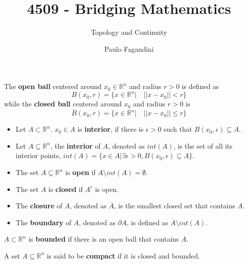 \documentclass[aspectratio=169]{beamer}
\title[]{4509 - Bridging Mathematics}
\subtitle{Topology and Continuity}
\author[P. Fagandini]{Paulo Fagandini}
\institute{}
\date{}
\begin{document}
\begin{frame}
   \begin{definition}
    The \textbf{open ball} centered around $x_0\in\mathds{R}^n$ and radius $r>0$ is defined as $$B(x_0,r)=\{x\in\mathds{R}^n | \quad ||x-x_0||<r\}$$ while the \textbf{closed ball} centered around $x_0$ and radius $r>0$ is $$\overline{B}(x_0,r)=\{x\in\mathds{R}^n| \quad ||x-x_0||\leq r\}$$
   \end{definition}
\end{frame}

\begin{frame}
    \begin{definition}
    \begin{itemize}
        \item Let $A\subset\mathds{R}^n$. $x_0\in A$ is \textbf{interior}, if there is $\epsilon>0$ such that $B(x_0,\epsilon)\subseteq A$.
        \item Let $A\subseteq \mathds{R}^n$, the \textbf{interior} of $A$, denoted as $int(A)$, is the set of all its interior points, $int(A)=\{x\in A|\exists\epsilon>0,B(x_0,\epsilon)\subseteq A\}$.
        \item The set $A\subseteq\mathds{R}^n$ is \textbf{open} if $A\setminus int(A)=\emptyset$.
        \item The set $A$ is \textbf{closed} if $A^c$ is open.
    \end{itemize}
    \end{definition}
\end{frame}

\begin{frame}

\begin{definition}
    \begin{itemize}
    \item The \textbf{closure} of $A$, denoted as $\overline{A}$, is the smallest closed set that contains $A$.
    \item The \textbf{boundary} of $A$, denoted as $\partial A$, is defined as $\overline{A}\setminus int(A)$.
    \end{itemize}
\end{definition}

\begin{definition}
    $A\subset\mathds{R}^n$ is \textbf{bounded} if there is an open ball that contains $A$.
\end{definition}
    
\begin{definition}
    A set $A\subseteq\mathds{R}^n$ is said to be \textbf{compact} if it is closed and bounded.
\end{definition}    
    
\end{frame}
\end{document}
